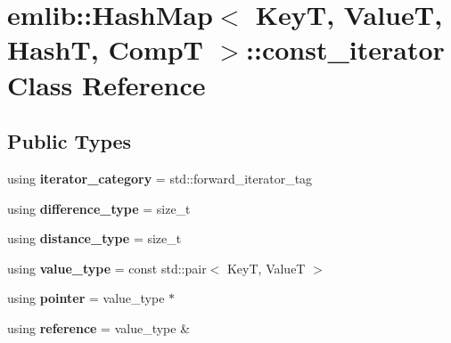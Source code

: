 \hypertarget{classemlib_1_1_hash_map_1_1const__iterator}{\section{emlib\+:\+:Hash\+Map$<$ Key\+T, Value\+T, Hash\+T, Comp\+T $>$\+:\+:const\+\_\+iterator Class Reference}
\label{classemlib_1_1_hash_map_1_1const__iterator}
}
\subsection*{Public Types}
\begin{DoxyCompactItemize}
\item 
\hypertarget{classemlib_1_1_hash_map_1_1const__iterator_af469fd1f548a8476f0012f202a60e67f}{using {\bfseries iterator\+\_\+category} = std\+::forward\+\_\+iterator\+\_\+tag}\label{classemlib_1_1_hash_map_1_1const__iterator_af469fd1f548a8476f0012f202a60e67f}

\item 
\hypertarget{classemlib_1_1_hash_map_1_1const__iterator_a59ca7267d12bd03d8d38c77fa86960d3}{using {\bfseries difference\+\_\+type} = size\+\_\+t}\label{classemlib_1_1_hash_map_1_1const__iterator_a59ca7267d12bd03d8d38c77fa86960d3}

\item 
\hypertarget{classemlib_1_1_hash_map_1_1const__iterator_aa293e7b3ebdb5b3051066801ed076cf0}{using {\bfseries distance\+\_\+type} = size\+\_\+t}\label{classemlib_1_1_hash_map_1_1const__iterator_aa293e7b3ebdb5b3051066801ed076cf0}

\item 
\hypertarget{classemlib_1_1_hash_map_1_1const__iterator_a5e3c7317a96b61c5b5e279503af98a33}{using {\bfseries value\+\_\+type} = const std\+::pair$<$ Key\+T, Value\+T $>$}\label{classemlib_1_1_hash_map_1_1const__iterator_a5e3c7317a96b61c5b5e279503af98a33}

\item 
\hypertarget{classemlib_1_1_hash_map_1_1const__iterator_aebe0955740555cfc1596c1150a031295}{using {\bfseries pointer} = value\+\_\+type $\ast$}\label{classemlib_1_1_hash_map_1_1const__iterator_aebe0955740555cfc1596c1150a031295}

\item 
\hypertarget{classemlib_1_1_hash_map_1_1const__iterator_a8557ba89a8bf7e38ec22b31f3c610584}{using {\bfseries reference} = value\+\_\+type \&}\label{classemlib_1_1_hash_map_1_1const__iterator_a8557ba89a8bf7e38ec22b31f3c610584}

\end{DoxyCompactItemize}
